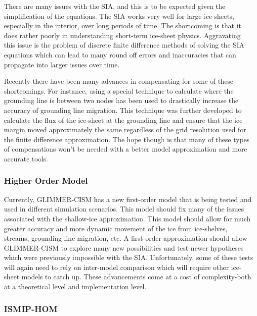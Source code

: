 There are many issues with the SIA, and this is to be expected given the simplification of the equations.  The SIA works very well for large ice sheets, especially in the interior, over long periods of time.  The shortcoming is that it does rather poorly in understanding short-term ice-sheet physics.  Aggravating this issue is the problem of discrete finite difference methods of solving the SIA equations which can lead to many round off errors and inaccuracies that can propagate into larger issues over time.\citep{Bergetal2006b}


Recently there have been many advances in compensating for some of these shortcomings.  For instance, using a special technique to calculate where the grounding line is between two nodes has been used to drastically increase the accuracy of grounding line migration. \citet{2004JF000202,Pattyn2006JGR}  This technique was further developed to calculate the flux of the ice-sheet at the grounding line and ensure that the ice margin moved approximately the same regardless of the grid resolution used for the finite difference approximation. \citep{Pollard:2009}  The hope though is that many of these types of compensations won't be needed with a better model approximation and more accurate tools.


\subsubsection{Higher Order Model}

Currently, GLIMMER-CISM has a new first-order model that is being tested and used in different simulation scenarios.  This model should fix many of the issues associated with the shallow-ice approximation.  This model should allow for much greater accuracy and more dynamic movement of the ice from ice-shelves, streams, grounding line migration, etc.  A first-order approximation should allow GLIMMER-CISM to explore many new possibilities and test newer hypotheses which were previously impossible with the SIA.  Unfortunately, some of these tests will again need to rely on inter-model comparison which will require other ice-sheet models to catch up.  These advancements come at a cost of complexity-both at a theoretical level and implementation level.

\subsubsection{ISMIP-HOM}

